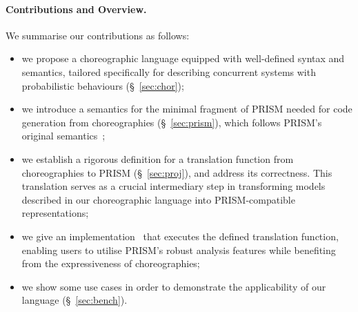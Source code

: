 \paragraph{Contributions and Overview.} We summarise our contributions as
follows:
\begin{itemize} 
\item we propose a choreographic language equipped with well-defined
  syntax and semantics, tailored specifically for describing
  concurrent systems with probabilistic behaviours
  (\S~\ref{sec:chor}); %

\item we introduce a semantics for the minimal fragment of PRISM
  needed for code generation from choreographies (\S~\ref{sec:prism}),
  which follows PRISM's original semantics~\cite{PRISMdoc};

\item we establish a rigorous definition for a translation function
  from choreographies to PRISM (\S~\ref{sec:proj}), and address its
  correctness. This translation serves as a crucial intermediary step
  in transforming models described in our choreographic language into
  PRISM-compatible representations;

\item we give an implementation~\cite{repository} that executes the
  defined translation function, enabling users to utilise PRISM's
  robust analysis features while benefiting from the expressiveness of
  choreographies;

\item we show some use cases in order to demonstrate the applicability
  of our language (\S~\ref{sec:bench}).
\end{itemize}


